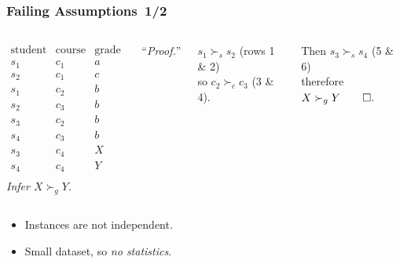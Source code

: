 \documentclass[bigger,xcolor={x11names,svgnames}]{beamer}
\begin{document}
\begin{frame}
    \frametitle{Failing Assumptions\hfill~1/2}
    \vfill
    \begin{columns}[c]
        $$
            \begin{array}{ccc}
                \text{student} & \text{course} & \text{grade} \\
                \hline
                s_1            & c_1           & a            \\
                s_2            & c_1           & c            \\
                s_1            & c_2           & b            \\
                s_2            & c_3           & b            \\
                s_3            & c_2           & b            \\
                s_4            & c_3           & b            \\
                s_3            & c_4           & X            \\
                s_4            & c_4           & Y            \\
            \end{array}
        $$
        \emph{Infer $X \succ_g Y$.}

        \bigskip
        ``\emph{Proof.}'' 

            \bigskip
            $s_1 \succ_s s_2$ (rows 1 \& 2)\\ so $c_2 \succ_c c_3$ (3 \& 4). 
            
            \bigskip
            Then $s_3 \succ_s s_4$ (5 \& 6)\\ therefore $X \succ_g Y\qed$.
    \end{columns}
    \vfill
    \begin{itemize}
        \item Instances are not independent.
        \item Small dataset, so \emph{no statistics}.
    \end{itemize}
\end{frame}
%
\end{document}
